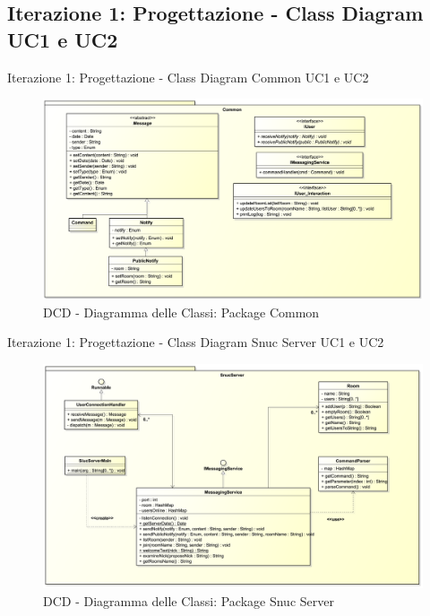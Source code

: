 \subsection{Iterazione 1: Progettazione - Class Diagram UC1 e UC2}
\begin{frame} {Iterazione 1: Progettazione - Class Diagram Common UC1 e UC2}
   \begin{figure}
     \includegraphics[scale=0.18]{image_astah/Iteration_1_DesignModel/ClassDiagramCommon.png}{\centering}
     \caption{DCD - Diagramma delle Classi: Package Common }
     \label{fig_UC1_UC2_DCD_1} 
   \end{figure}
\end{frame}

\begin{frame} {Iterazione 1: Progettazione - Class Diagram Snuc Server UC1 e UC2}
   \begin{figure}
     \includegraphics[scale=0.156]{image_astah/Iteration_1_DesignModel/ClassDiagramSnucServer.png}{\centering}
     \caption{DCD - Diagramma delle Classi: Package Snuc Server }
     \label{fig_UC1_UC2_DCD_2} 
   \end{figure}
\end{frame}

